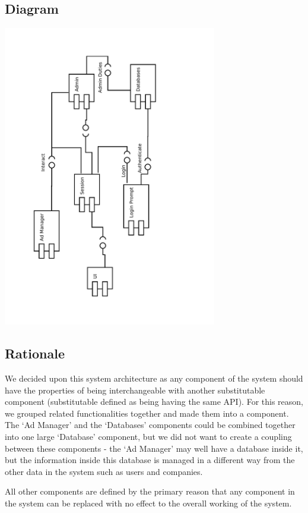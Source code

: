 \documentclass[11pt]{article}
\begin{document}
\subsection{Diagram}

\begin{centering}
  \includegraphics[width=0.7\textwidth,angle=270]{PSDDiagram.pdf}
\end{centering}

\subsection{Rationale}

We decided upon this system architecture as any component of the system should 
have the properties of being interchangeable with another substitutable 
component (substitutable defined as being having the same API). For this reason, 
we grouped related functionalities together and made them into a component. 
The `Ad Manager' and the `Databases' components could be combined together 
into one large `Database' component, but we did not want to create a coupling 
between these components - the `Ad Manager' may well have a database inside 
it, but the information inside this database is managed in a different way from 
the other data in the system such as users and companies.

All other components are defined by the primary reason that any component in the 
system can be replaced with no effect to the overall working of the system.
\end{document}
